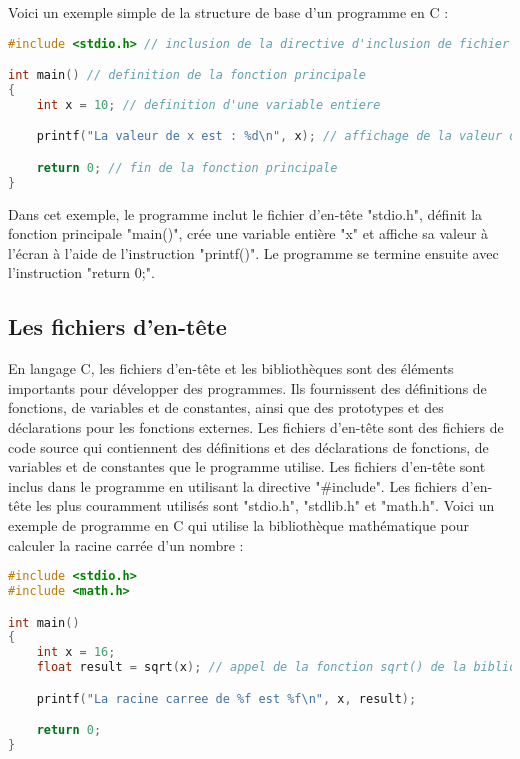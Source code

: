 \documentclass{uofa-eng-assignment}
\begin{document}
\noindent
Voici un exemple simple de la structure de base d'un programme en C :

\begin{lstlisting}[language=C]
#include <stdio.h> // inclusion de la directive d'inclusion de fichier

int main() // definition de la fonction principale
{
    int x = 10; // definition d'une variable entiere

    printf("La valeur de x est : %d\n", x); // affichage de la valeur de x a l'ecran

    return 0; // fin de la fonction principale
}
\end{lstlisting}

\noindent \newline
Dans cet exemple, le programme inclut le fichier d'en-tête "stdio.h", définit la fonction principale "main()", crée une variable entière "x" et affiche sa valeur à l'écran à l'aide de l'instruction "printf()". Le programme se termine ensuite avec l'instruction "return 0;".

\subsection{Les fichiers d'en-tête}
En langage C, les fichiers d'en-tête et les bibliothèques sont des éléments importants pour développer des programmes. Ils fournissent des définitions de fonctions, de variables et de constantes, ainsi que des prototypes et des déclarations pour les fonctions externes.
\newline \newline
Les fichiers d'en-tête sont des fichiers de code source qui contiennent des définitions et des déclarations de fonctions, de variables et de constantes que le programme utilise. Les fichiers d'en-tête sont inclus dans le programme en utilisant la directive "\#include". Les fichiers d'en-tête les plus couramment utilisés sont "stdio.h", "stdlib.h" et "math.h".
\newline \newline
Voici un exemple de programme en C qui utilise la bibliothèque mathématique pour calculer la racine carrée d'un nombre :
\begin{lstlisting}[language=C]
#include <stdio.h>
#include <math.h>

int main()
{
    int x = 16;
    float result = sqrt(x); // appel de la fonction sqrt() de la bibliotheque mathematique

    printf("La racine carree de %f est %f\n", x, result);

    return 0;
}
\end{lstlisting}
\end{document}
